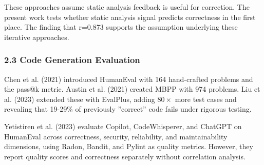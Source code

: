 These approaches assume static analysis feedback is useful for correction. The present work tests whether static analysis signal predicts correctness in the first place. The finding that r=0.873 supports the assumption underlying these iterative approaches.

\subsubsection{2.3 Code Generation Evaluation}

Chen et al. (2021) introduced HumanEval with 164 hand-crafted problems and the pass@k metric. Austin et al. (2021) created MBPP with 974 problems. Liu et al. (2023) extended these with EvalPlus, adding $80\times$ more test cases and revealing that 19-29\% of previously ''correct'' code fails under rigorous testing.

Yetistiren et al. (2023) evaluate Copilot, CodeWhisperer, and ChatGPT on HumanEval across correctness, security, reliability, and maintainability dimensions, using Radon, Bandit, and Pylint as quality metrics. However, they report quality scores and correctness separately without correlation analysis.

\begin{table}[htbp]
\centering
{}
\end{table}
